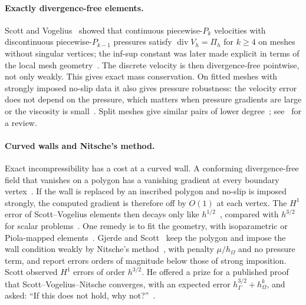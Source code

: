 
\paragraph{Exactly divergence-free elements.}
Scott and Vogelius~\cite{ScottVogelius1985} showed that continuous piecewise-$P_k$ velocities with discontinuous piecewise-$P_{k-1}$ pressures satisfy $\operatorname{div}V_h=\Pi_h$ for $k\ge4$ on meshes without singular vertices; the inf-sup constant was later made explicit in terms of the local mesh geometry~\cite{GuzmanScott2019}. The discrete velocity is then divergence-free pointwise, not only weakly. This gives exact mass conservation. On fitted meshes with strongly imposed no-slip data it also gives pressure robustness: the velocity error does not depend on the pressure, which matters when pressure gradients are large or the viscosity is small~\cite{JohnEtAl2017}. Split meshes give similar pairs of lower degree~\cite{GuzmanNeilan2018}; see~\cite{Neilan2020} for a review.

\paragraph{Curved walls and Nitsche's method.}
Exact incompressibility has a cost at a curved wall. A conforming divergence-free field that vanishes on a polygon has a vanishing gradient at every boundary vertex~\cite{ScottPrize,GjerdeScott2024}. If the wall is replaced by an inscribed polygon and no-slip is imposed strongly, the computed gradient is therefore off by $O(1)$ at each vertex. The $H^1$ error of Scott--Vogelius elements then decays only like $h^{1/2}$~\cite{ScottPrize,GjerdeScott2024}, compared with $h^{3/2}$ for scalar problems~\cite{BergerScottStrang1972,Scott1975}. One remedy is to fit the geometry, with isoparametric or Piola-mapped elements~\cite{NeilanOtus2021,DurstNeilan2024}. Gjerde and Scott~\cite{GjerdeScott2024} keep the polygon and impose the wall condition weakly by Nitsche's method~\cite{Nitsche1971}, with penalty $\mu/h_\Omega$ and no pressure term, and report errors orders of magnitude below those of strong imposition. Scott observed $H^1$ errors of order $h^{3/2}$. He offered a prize for a published proof that Scott--Vogelius--Nitsche converges, with an expected error $h_\Gamma^{3/2}+h_\Omega^k$, and asked: ``If this does not hold, why not?''~\cite{ScottPrize}.

